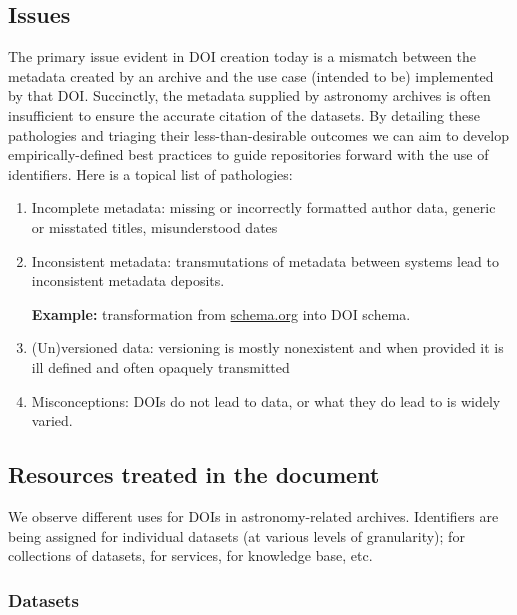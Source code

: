 \documentclass[11pt,a4paper]{ivoa}
\begin{document}
\subsection{Issues}\hypertarget{issues}{}\label{sec:issues}

The primary issue evident in DOI creation today is a mismatch between the metadata created by an archive and the use case (intended to be) implemented by that DOI. Succinctly, the metadata supplied by astronomy archives is often insufficient to ensure the accurate citation of the datasets. \newline
By detailing these pathologies and triaging their less-than-desirable outcomes we can aim to develop empirically-defined best practices to guide repositories forward with the use of identifiers. Here is a topical list of pathologies:

\begin{enumerate}
\item Incomplete metadata: missing or incorrectly formatted author data, generic or misstated titles, misunderstood dates
\item Inconsistent metadata: transmutations of metadata between systems lead to inconsistent metadata deposits. 

\textbf{Example:} transformation from \href{http://schema.org}{schema.org} into DOI schema.
\item (Un)versioned data: versioning is mostly nonexistent and when provided it is ill defined and often opaquely transmitted
\item Misconceptions: DOIs do not lead to data, or what they do lead to is widely varied.
\end{enumerate}

\subsection{Resources treated in the document}\hypertarget{resources-treated-in-the-document}{}\label{sec:resources-treated-in-the-document}

We observe different uses for DOIs in astronomy-related archives. Identifiers are being assigned for individual datasets (at various levels of granularity); for collections of datasets, for services, for knowledge base, etc.

\subsubsection{Datasets}\hypertarget{datasets}{}\label{sec:datasets}
\end{document}
